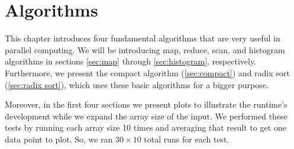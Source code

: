 \chapter{Algorithms}
\label{chap:algorithms}

This chapter introduces four fundamental algorithms that are very useful in parallel computing.
We will be introducing map, reduce, scan, and histogram algorithms in sections \ref{sec:map} through \ref{sec:histogram}, respectively.
Furthermore, we present the compact algorithm (\cref{sec:compact}) and radix sort (\cref{sec:radix sort}), which uses these basic algorithms for a bigger purpose.

Moreover, in the first four sections we present plots to illustrate the runtime's development while we expand the array size of the input.
We performed these tests by running each array size 10 times and averaging that result to get one data point to plot.
So, we ran $30 \times 10$ total runs for each test.

%      
%      

%      
%      








